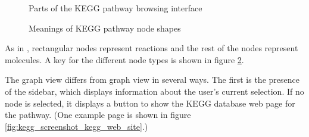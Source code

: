 \begin{figure}[hbtp]
    \caption{\label{fig:kegg_pathway_diagram} Parts of the KEGG pathway browsing
    interface}
\end{figure}

\begin{figure}[hbtp]
    \caption{\label{fig:kegg_node_legend} Meanings of KEGG pathway node shapes}
\end{figure}

As in \mawapp, rectangular nodes represent reactions and the rest of the nodes
represent molecules. A key for the different node types is shown in figure
\ref{fig:kegg_node_legend}.

The graph view differs from \mawappp graph view in several ways. The first
is the presence of the sidebar, which displays information about the user's
current selection. If no node is selected, it displays a button to show the KEGG
database web page for the pathway. (One example page is shown in figure
\ref{fig:kegg_screenshot_kegg_web_site}.)

